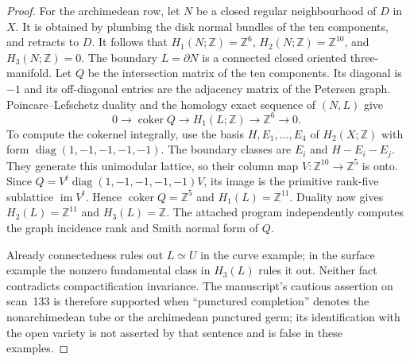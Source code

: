 \begin{proof}
For the archimedean row, let $N$ be a closed regular neighbourhood of
$D$ in $X$. It is obtained by plumbing the disk normal bundles of the
ten components, and retracts to $D$. It follows that
$H_1(N;\mathbb Z)=\mathbb Z^6$, $H_2(N;\mathbb Z)=\mathbb Z^{10}$,
and $H_3(N;\mathbb Z)=0$. The boundary $L=\partial N$ is a connected
closed oriented three-manifold. Let $Q$ be the intersection matrix of
the ten components. Its diagonal is $-1$ and its off-diagonal entries
are the adjacency matrix of the Petersen graph. Poincare--Lefschetz
duality and the homology exact sequence of $(N,L)$ give
\[
 0\longrightarrow\operatorname{coker}Q\longrightarrow H_1(L;\mathbb Z)
       \longrightarrow\mathbb Z^6\longrightarrow0.
\]
To compute the cokernel integrally, use the basis $H,E_1,\ldots,E_4$ of
$H_2(X;\mathbb Z)$ with form $\operatorname{diag}(1,-1,-1,-1,-1)$.
The boundary classes are $E_i$ and $H-E_i-E_j$. They generate this
unimodular lattice, so their column map $V:\mathbb Z^{10}\to\mathbb Z^5$
is onto. Since $Q=V^t\operatorname{diag}(1,-1,-1,-1,-1)V$, its image is
the primitive rank-five sublattice $\operatorname{im}V^t$. Hence
$\operatorname{coker}Q=\mathbb Z^5$ and $H_1(L)=\mathbb Z^{11}$.
Duality now gives $H_2(L)=\mathbb Z^{11}$ and $H_3(L)=\mathbb Z$.
The attached program independently computes the graph incidence rank
and Smith normal form of $Q$.

Already connectedness rules out $L\simeq U$ in the curve example; in
the surface example the nonzero fundamental class in $H_3(L)$ rules it
out. Neither fact contradicts compactification invariance. The
manuscript's cautious assertion on scan~133 is therefore supported
when ``punctured completion'' denotes the nonarchimedean tube or the
archimedean punctured germ; its identification with the open variety is
not asserted by that sentence and is false in these examples.
\end{proof}
